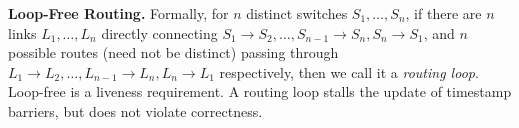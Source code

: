 \textbf{Loop-Free Routing.}
Formally, for $n$ distinct switches $S_1, \ldots, S_n$, if there are $n$ links $L_1, \ldots, L_n$ directly connecting $S_1 \rightarrow S_2, \ldots, S_{n-1} \rightarrow S_n, S_n \rightarrow S_1$, and $n$ possible routes (need not be distinct) passing through $L_1 \rightarrow L_2, \ldots, L_{n-1} \rightarrow L_n, L_n \rightarrow L_1$ respectively, then we call it a \textit{routing loop}.
Loop-free is a liveness requirement.
A routing loop stalls the update of timestamp barriers, but does not violate correctness.
\fi